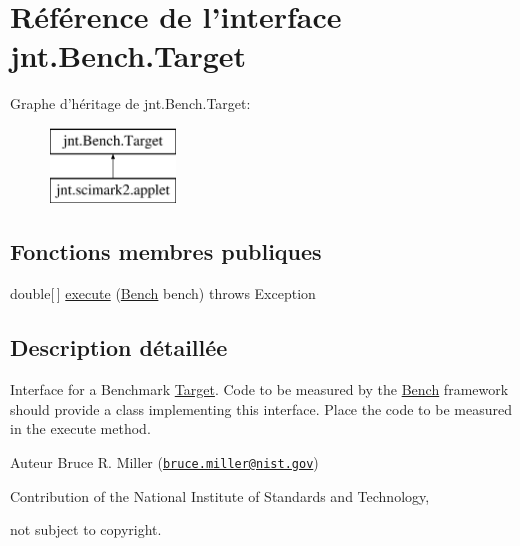 \hypertarget{interfacejnt_1_1Bench_1_1Target}{\section{Référence de l'interface jnt.\-Bench.\-Target}
\label{interfacejnt_1_1Bench_1_1Target}
}
Graphe d'héritage de jnt.\-Bench.\-Target\-:\begin{figure}[H]
\begin{center}
\leavevmode
\includegraphics[height=2.000000cm]{de/d37/interfacejnt_1_1Bench_1_1Target}
\end{center}
\end{figure}
\subsection*{Fonctions membres publiques}
\begin{DoxyCompactItemize}
\item 
double\mbox{[}$\,$\mbox{]} \hyperlink{interfacejnt_1_1Bench_1_1Target_aa848f1ea6d28c6423b3b89d10482dabe}{execute} (\hyperlink{classjnt_1_1Bench_1_1Bench}{Bench} bench)  throws Exception
\end{DoxyCompactItemize}


\subsection{Description détaillée}
Interface for a Benchmark \hyperlink{interfacejnt_1_1Bench_1_1Target}{Target}. Code to be measured by the \hyperlink{classjnt_1_1Bench_1_1Bench}{Bench} framework should provide a class implementing this interface. Place the code to be measured in the execute method.

\begin{DoxyAuthor}{Auteur}
Bruce R. Miller (\href{mailto:bruce.miller@nist.gov}{\tt bruce.\-miller@nist.\-gov}) 

Contribution of the National Institute of Standards and Technology, 

not subject to copyright. 
\end{DoxyAuthor}


